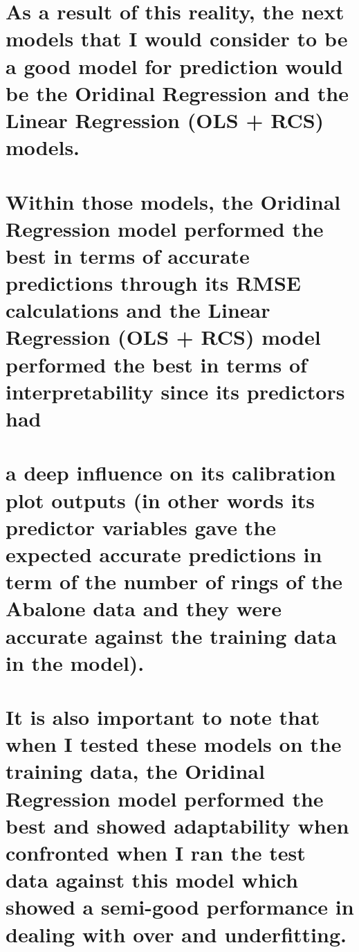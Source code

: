 \documentclass[
  letterpaper,
  DIV=11,
  numbers=noendperiod]{scrreprt}
\begin{document}
{

\chapter{As a result of this reality, the next models that I would
consider to be a good model for prediction would be the Oridinal
Regression and the Linear Regression (OLS + RCS)
models.}\label{as-a-result-of-this-reality-the-next-models-that-i-would-consider-to-be-a-good-model-for-prediction-would-be-the-oridinal-regression-and-the-linear-regression-ols-rcs-models.}


\chapter{Within those models, the Oridinal Regression model performed
the best in terms of accurate predictions through its RMSE calculations
and the Linear Regression (OLS + RCS) model performed the best in terms
of interpretability since its predictors
had}\label{within-those-models-the-oridinal-regression-model-performed-the-best-in-terms-of-accurate-predictions-through-its-rmse-calculations-and-the-linear-regression-ols-rcs-model-performed-the-best-in-terms-of-interpretability-since-its-predictors-had}


\chapter{a deep influence on its calibration plot outputs (in other
words its predictor variables gave the expected accurate predictions in
term of the number of rings of the Abalone data and they were accurate
against the training data in the
model).}\label{a-deep-influence-on-its-calibration-plot-outputs-in-other-words-its-predictor-variables-gave-the-expected-accurate-predictions-in-term-of-the-number-of-rings-of-the-abalone-data-and-they-were-accurate-against-the-training-data-in-the-model.}


\chapter{It is also important to note that when I tested these models on
the training data, the Oridinal Regression model performed the best and
showed adaptability when confronted when I ran the test data against
this model which showed a semi-good performance in dealing with over and
underfitting.}\label{it-is-also-important-to-note-that-when-i-tested-these-models-on-the-training-data-the-oridinal-regression-model-performed-the-best-and-showed-adaptability-when-confronted-when-i-ran-the-test-data-against-this-model-which-showed-a-semi-good-performance-in-dealing-with-over-and-underfitting.}

}
\end{document}
